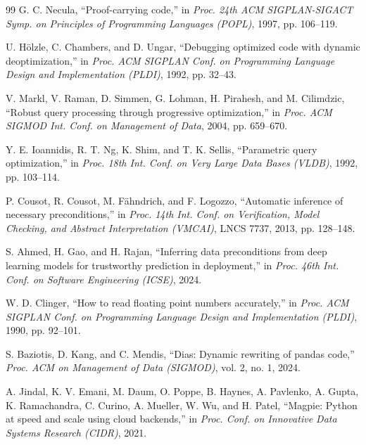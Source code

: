 \documentclass[conference]{IEEEtran}
\begin{document}
\begin{thebibliography}{99}
G. C. Necula, ``Proof-carrying code,'' in \emph{Proc. 24th ACM SIGPLAN-SIGACT Symp. on Principles of
Programming Languages (POPL)}, 1997, pp. 106--119.

U. H\"olzle, C. Chambers, and D. Ungar, ``Debugging optimized code with dynamic deoptimization,'' in
\emph{Proc. ACM SIGPLAN Conf. on Programming Language Design and Implementation (PLDI)}, 1992,
pp. 32--43.

V. Markl, V. Raman, D. Simmen, G. Lohman, H. Pirahesh, and M. Cilimdzic, ``Robust query processing
through progressive optimization,'' in \emph{Proc. ACM SIGMOD Int. Conf. on Management of Data},
2004, pp. 659--670.

Y. E. Ioannidis, R. T. Ng, K. Shim, and T. K. Sellis, ``Parametric query optimization,'' in
\emph{Proc. 18th Int. Conf. on Very Large Data Bases (VLDB)}, 1992, pp. 103--114.

P. Cousot, R. Cousot, M. F\"ahndrich, and F. Logozzo, ``Automatic inference of necessary
preconditions,'' in \emph{Proc. 14th Int. Conf. on Verification, Model Checking, and Abstract
Interpretation (VMCAI)}, LNCS 7737, 2013, pp. 128--148.

S. Ahmed, H. Gao, and H. Rajan, ``Inferring data preconditions from deep learning models for
trustworthy prediction in deployment,'' in \emph{Proc. 46th Int. Conf. on Software Engineering
(ICSE)}, 2024.

W. D. Clinger, ``How to read floating point numbers accurately,'' in \emph{Proc. ACM SIGPLAN Conf.
on Programming Language Design and Implementation (PLDI)}, 1990, pp. 92--101.

S. Baziotis, D. Kang, and C. Mendis, ``Dias: Dynamic rewriting of pandas code,'' \emph{Proc. ACM
on Management of Data (SIGMOD)}, vol. 2, no. 1, 2024.

A. Jindal, K. V. Emani, M. Daum, O. Poppe, B. Haynes, A. Pavlenko, A. Gupta, K. Ramachandra,
C. Curino, A. Mueller, W. Wu, and H. Patel, ``Magpie: Python at speed and scale using cloud
backends,'' in \emph{Proc. Conf. on Innovative Data Systems Research (CIDR)}, 2021.

\end{thebibliography}
\end{document}
